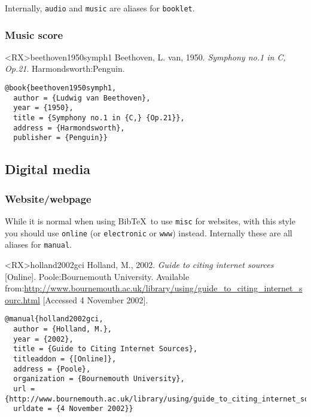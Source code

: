 \documentclass[10pt,a4paper]{article}
\newenvironment{info}{%
  \begin{list}{\makebox[2em][c]{\faInfoCircle}}{%
    \setlength{\leftmargin}{2em}
    \setlength{\labelwidth}{2em}
    \setlength{\labelsep}{0pt}}
}{\end{list}}
\begin{document}
\begin{info}\item Internally, \texttt{audio} and \texttt{music} are aliases for \texttt{booklet}.\end{info}

\subsubsection*{Music score}

\begin{bibexbox}<RX>{beethoven1950symph1}
  Beethoven, L. van, 1950. \emph{Symphony no.1 in C, Op.21}. Harmondsworth:\@ Penguin.
  \tcblower
\begin{Verbatim}
@book{beethoven1950symph1,
  author = {Ludwig van Beethoven},
  year = {1950},
  title = {Symphony no.1 in {C,} {Op.21}},
  address = {Harmondsworth},
  publisher = {Penguin}}
\end{Verbatim}
\end{bibexbox}

\subsection{Digital media}

\subsubsection*{Website\slash webpage}

While it is normal when using Bib\TeX\ to use \texttt{misc} for websites,
with this style you should use \texttt{online} (or \texttt{electronic} or \texttt{www}) instead.
Internally these are all aliases for \texttt{manual}.

\begin{bibexbox}<RX>{holland2002gci}
  Holland, M., 2002. \emph{Guide to citing internet sources} [Online]. Poole:\@ Bournemouth University. Available from:\@ \url{http://www.bournemouth.ac.uk/library/using/guide_to_citing_internet_sourc.html} [Accessed 4 November 2002].
  \tcblower
\begin{Verbatim}
@manual{holland2002gci,
  author = {Holland, M.},
  year = {2002},
  title = {Guide to Citing Internet Sources},
  titleaddon = {[Online]},
  address = {Poole},
  organization = {Bournemouth University},
  url = {http://www.bournemouth.ac.uk/library/using/guide_to_citing_internet_sourc.html},
  urldate = {4 November 2002}}
\end{Verbatim}
\end{bibexbox}
\end{document}
